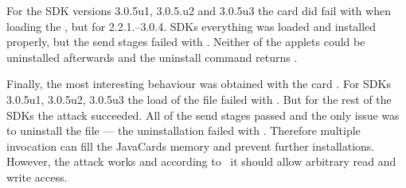             For the SDK versions 3.0.5u1, 3.0.5.u2 and 3.0.5u3 the card \Acard did fail with \swwrongdata when loading the \appletscap, but for 2.2.1.--3.0.4. SDKs everything was loaded and installed properly, but the send stages failed with \swunknown. Neither of the applets could be uninstalled afterwards and the uninstall command returns \swconditionsnotsatisfied.

            Finally, the most interesting behaviour was obtained with the card \Jcard. For SDKs 3.0.5u1, 3.0.5u2, 3.0.5u3 the load of the file \appletscap failed with \jerror. But for the rest of the SDKs the attack succeeded. All of the send stages passed and the only issue was to uninstall the \appletscap file --- the uninstallation failed with \swconditionsnotsatisfied. Therefore multiple invocation can fill the JavaCards memory and prevent further installations. However, the attack works and according to~\cite{se:oracle:part1} it should allow arbitrary read and write access.






